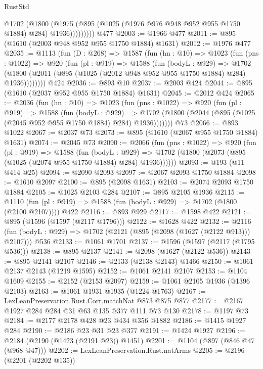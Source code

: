 \begin{lexlean}{RustStd}
\begin{coremodule}
{\begin{coremodule}
{{{{{{{{{              @1702
                (@1800
                  (@1975 (@895 (@1025 (@1976 @976 @948 @952 @955 @1750 @1884) @284) @1936)))))))))
    @477
@2003 := @1966 @477
@2011 := @895 (@1610 (@2003 @948 @952 @955 @1750 @1884) @1631)
@2012 := @1976 @477
@2035 := @1113
    (fun (D : @268) =>
    @1587
      (fun (hn : @10) =>
      @1023
        (fun (pns : @1022) =>
        @920
          (fun (pl : @919) =>
          @1588
            (fun (bodyL : @929) =>
            @1702 (@1800 (@2011 (@895 (@1025 (@2012 @948 @952 @955 @1750 @1884) @284) @1936))))))))
    @424
@2036 := @893 @10
@2037 := @2003 @424
@2044 := @895 (@1610 (@2037 @952 @955 @1750 @1884) @1631)
@2045 := @2012 @424
@2065 := @2036
    (fun (hn : @10) =>
    @1023
      (fun (pns : @1022) =>
      @920
        (fun (pl : @919) =>
        @1588
          (fun (bodyL : @929) =>
          @1702 (@1800 (@2044 (@895 (@1025 (@2045 @952 @955 @1750 @1884) @284) @1936)))))))
    @73
@2066 := @893 @1022
@2067 := @2037 @73
@2073 := @895 (@1610 (@2067 @955 @1750 @1884) @1631)
@2074 := @2045 @73
@2090 := @2066
    (fun (pns : @1022) =>
    @920
      (fun (pl : @919) =>
      @1588
        (fun (bodyL : @929) =>
        @1702 (@1800 (@2073 (@895 (@1025 (@2074 @955 @1750 @1884) @284) @1936))))))
@2093 := @193 (@11 @414 @25)
@2094 := @2090 @2093
@2097 := @2067 @2093 @1750 @1884
@2098 := @1610 @2097
@2100 := @895 (@2098 @1631)
@2103 := @2074 @2093 @1750 @1884
@2105 := @1025 @2103 @284
@2107 := @895 @2105 @1936
@2115 := @1110 (fun (pl : @919) => @1588 (fun (bodyL : @929) => @1702 (@1800 (@2100 @2107)))) @422
@2116 := @893 @929
@2117 := @1598 @422
@2121 := @895 (@1596 (@1597 (@2117 @1796)))
@2122 := @1628 @422
@2132 := @2116 (fun (bodyL : @929) => @1702 (@2121 (@895 (@2098 (@1627 (@2122 @913))) @2107))) @536
@2133 := @1061 @1701
@2137 := @1596 (@1597 (@2117 (@1795 @536)))
@2138 := @895 @2137
@2141 := @2098 (@1627 (@2122 @536))
@2143 := @895 @2141 @2107
@2146 := @2133 (@2138 @2143) @1466
@2150 := @1061 @2137 @2143 (@1219 @1595)
@2152 := @1061 @2141 @2107
@2153 := @1104 @1609
@2155 := @2152 (@2153 @2097)
@2159 := @1061 @2105 @1936 (@1396 @2103)
@2163 := @1061 @1931 @1935 (@1224 @1763)
@2167 := LexLeanPreservation.Rust.Corr.matchNat @873 @875 @877
@2177 := @2167 @1927 @284 @284 @31 @63 @135 @377 @111 @73 @130
@2178 := @1197 @73
@2184 := @2177 @2178 @428 @23 @434 @356 @1882
@2186 := @1415 @1927 @284
@2190 := @2186 @23 @31 @23 @377
@2191 := @1424 @1927
@2196 := @2184 (@2190 (@1423 (@2191 @23)) @1451)
@2201 := @1104 (@897 (@846 @47 (@968 @47)))
@2202 := LexLeanPreservation.Rust.natArms
@2205 := @2196 (@2201 (@2202 @135))
}}}}}}}}}
\end{coremodule}}
\end{coremodule}
\end{lexlean}
